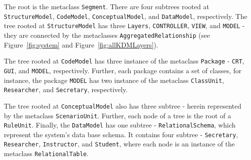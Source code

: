 %
The root is the metaclass \texttt{Segment}. There are four subtrees rooted at \texttt{StructureModel}, \texttt{CodeModel}, \texttt{ConceptualModel}, and \texttt{DataModel}, respectively. 
The tree rooted at \texttt{StructureModel} has three \texttt{Layers}, \texttt{CONTROLLER}, \texttt{VIEW}, and \texttt{MODEL} - they are connected by the metaclasses \texttt{AggregatedRelationship} (see Figure~\ref{fig:system} and Figure~\ref{fig:allKDMLayers}).

The tree rooted at \texttt{CodeModel} has three instance of the metaclass \texttt{Package} - \texttt{CRT}, \texttt{GUI}, and \texttt{MODEL}, respectively. Further, each package contains a set of classes, for instance, the package \texttt{MODEL} has two instance of the metaclass \texttt{ClassUnit}, \texttt{Researcher}, and \texttt{Secretary}, respectively.

The tree rooted at \texttt{ConceptualModel} also has three subtree - herein represented by the metaclass \texttt{ScenarioUnit}. Further, each node of a tree is the root of a \texttt{RuleUnit}. Finally, the \texttt{DataModel} has one subtree - \texttt{RelationalSchema}, which represent the system's data base schema. It contains four subtree - \texttt{Secretary}, \texttt{Researcher}, \texttt{Instructor}, and \texttt{Student}, where each node is an instance of the metaclass \texttt{RelationalTable}.







